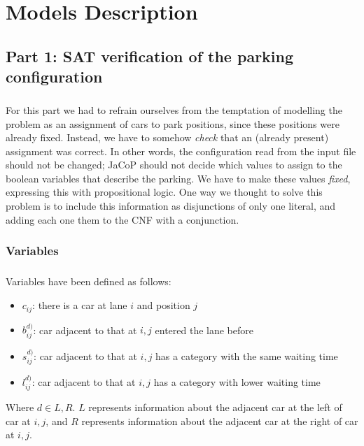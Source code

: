 \chapter{Models Description}
\label{chapter: models description}









\section{Part 1: SAT verification of the parking configuration}

\paragraph{}
For this part we had to refrain ourselves from the temptation of modelling the
problem as an assignment of cars to park positions, since these positions were
already fixed. Instead, we have to somehow \textit{check} that an (already
present) assignment was correct. In other words, the configuration read from the
input file should not be changed; JaCoP should not decide which values to assign
to the boolean variables that describe the parking. We have to make these values
\textit{fixed}, expressing this with propositional logic. One way we thought to
solve this problem is to include this information as disjunctions of only one
literal, and adding each one them to the CNF with a conjunction.


\subsection{Variables}

\paragraph{}
Variables have been defined as follows:
\begin{itemize}
  \item $c_{ij}$: there is a car at lane $i$ and position $j$
  \item $b^{d)}_{ij}$: car adjacent to that at $i,j$ entered the lane before
  \item $s^{d)}_{ij}$: car adjacent to that at $i,j$ has a category with the same waiting time
  \item $l^{d)}_{ij}$: car adjacent to that at $i,j$ has a category with lower waiting time
\end{itemize}
Where $d \in {L,R}$. $L$ represents information about the adjacent car at the left of car at $i,j$, and $R$ represents information about the adjacent car at the right of car at $i,j$.

